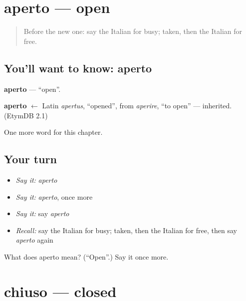 \section[aperto]{aperto — open}

\label{lesson:IT-C124-aperto}



\begin{quote}
Before the new one: say the Italian for busy; taken, then the Italian for free.
\end{quote}

\subsection*{You'll want to know: aperto}
\textbf{aperto} — \textquotedblleft{}open\textquotedblright{}.

\begin{cousinweb}
\textbf{aperto} $\leftarrow$ Latin \emph{apertus}, \textquotedblleft{}opened\textquotedblright{}, from \emph{aperire}, \textquotedblleft{}to open\textquotedblright{} — inherited. (EtymDB 2.1)
\end{cousinweb}

\begin{grammarlens}[title={What you've built}]
One more word for this chapter.
\end{grammarlens}

\subsection*{Your turn}
\begin{itemize}
\raggedright
  \item \emph{Say it:} \emph{aperto}
  \item \emph{Say it:} \emph{aperto}, once more
  \item \emph{Say it:} say \emph{aperto}
  \item \emph{Recall:} say the Italian for busy; taken, then the Italian for free, then say \emph{aperto} again
\end{itemize}

\begin{tcolorbox}[breakable,colback=teal!4,colframe=teal!35!black,title={Before you move on}]
What does aperto mean? (\textquotedblleft{}Open\textquotedblright{}.) Say it once more.
\end{tcolorbox}
\section[chiuso]{chiuso — closed}


